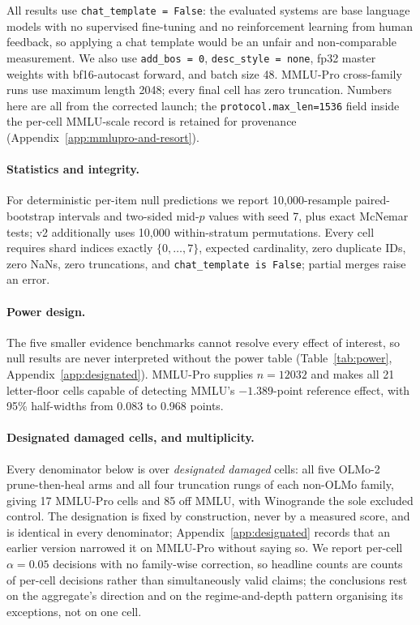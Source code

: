 All results use \texttt{chat\_template = False}: the evaluated systems are base language models with no supervised fine-tuning and no reinforcement learning from human feedback, so applying a chat template would be an unfair and non-comparable measurement. We also use \texttt{add\_bos = 0}, \texttt{desc\_style = none}, fp32 master weights with bf16-autocast forward, and batch size 48. MMLU-Pro cross-family runs use maximum length 2048; every final cell has zero truncation. Numbers here are all from the corrected launch; the \texttt{protocol.max\_len=1536} field inside the per-cell MMLU-scale record is retained for provenance (Appendix~\ref{app:mmlupro-and-resort}).

\paragraph{Statistics and integrity.}
For deterministic per-item null predictions we report 10,000-resample paired-bootstrap intervals and two-sided mid-$p$ values with seed 7, plus exact McNemar tests; v2 additionally uses 10,000 within-stratum permutations. Every cell requires shard indices exactly $\{0,\ldots,7\}$, expected cardinality, zero duplicate IDs, zero NaNs, zero truncations, and \texttt{chat\_template is False}; partial merges raise an error.

\paragraph{Power design.}
The five smaller evidence benchmarks cannot resolve every effect of interest, so null results are never interpreted without the power table (Table~\ref{tab:power}, Appendix~\ref{app:designated}).
MMLU-Pro supplies $n=12032$ and makes all 21 letter-floor cells capable of detecting MMLU's $-1.389$-point reference effect, with 95\% half-widths from 0.083 to 0.968 points.

\paragraph{Designated damaged cells, and multiplicity.}
Every denominator below is over \emph{designated damaged} cells: all five OLMo-2 prune-then-heal arms and all four truncation rungs of each non-OLMo family, giving 17 MMLU-Pro cells and 85 off MMLU, with Winogrande the sole excluded control. The designation is fixed by construction, never by a measured score, and is identical in every denominator; Appendix~\ref{app:designated} records that an earlier version narrowed it on MMLU-Pro without saying so. We report per-cell $\alpha=0.05$ decisions with no family-wise correction, so headline counts are counts of per-cell decisions rather than simultaneously valid claims; the conclusions rest on the aggregate's direction and on the regime-and-depth pattern organising its exceptions, not on one cell.
